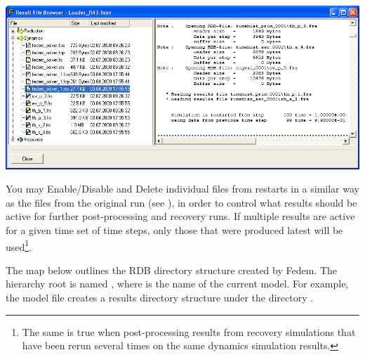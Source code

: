 \medskip\noindent
\includegraphics[width=\textwidth]{Figures/Dialogs/8-ResultFileBrowserRestart}

\medskip
{}

You may Enable/Disable and Delete individual files from restarts
in a similar way as the files from the original run
(see ), in order to control
what results should be active for further post-processing and recovery runs.
If multiple results are active for a given time set of time steps,
only those that were produced latest will be used\footnote{
The same is true when post-processing results from recovery simulations that
have been rerun several times on the same dynamics simulation results.}.




The map below outlines the RDB directory structure created by Fedem.
The hierarchy root is named , where \File{[modelname]}
is the name of the current model. For example, the model file
 creates a results directory structure under
the directory .

